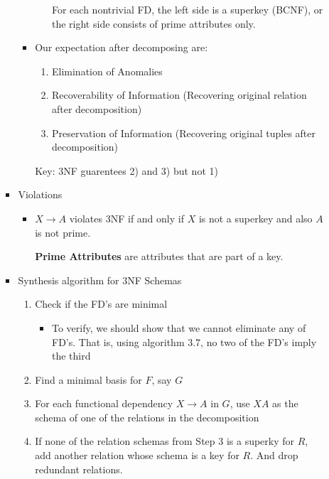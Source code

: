 \documentclass[12pt]{article}
\begin{document}
\begin{enumerate}[1.]
\begin{enumerate}[a)]
\begin{itemize}
\begin{itemize}
\begin{itemize}
                    For each nontrivial FD, the left side is a superkey (BCNF), or
                    the right side consists of prime attributes only.
                \end{itemize}
                \item Our expectation after decomposing are:
                \begin{enumerate}[1.]
                    \item Elimination of Anomalies
                    \item Recoverability of Information (Recovering original relation after decomposition)
                    \item Preservation of Information (Recovering original tuples after decomposition)
                \end{enumerate}

                \bigskip

                Key: \color{red}3NF guarentees 2) and 3) but not 1)\color{black}
            \end{itemize}
            \item Violations
            \begin{itemize}
                \item $X \to A$ violates 3NF if and only if $X$ is not a superkey
                and also $A$ is not prime.

                \bigskip

                \textbf{Prime Attributes} are attributes that are part of a key.

                \bigskip
            \end{itemize}
            \item Synthesis algorithm for 3NF Schemas
            \begin{enumerate}[1.]
                \item Check if the FD's are minimal
                \begin{itemize}
                    \item To verify, we should show that we cannot eliminate any of FD's.
                    That is, using algorithm 3.7, no two of the FD's imply the third
                \end{itemize}
                \item Find a minimal basis for $F$, say $G$
                \item For each functional dependency $X \to A$ in $G$, use $XA$
                as the schema of one of the relations in the decomposition
                \item If none of the relation schemas from Step 3 is a superky for $R$,
                add another relation whose schema is a key for $R$. And drop redundant relations.
            \end{enumerate}


\end{itemize}
\end{enumerate}
\end{enumerate}
\end{document}
